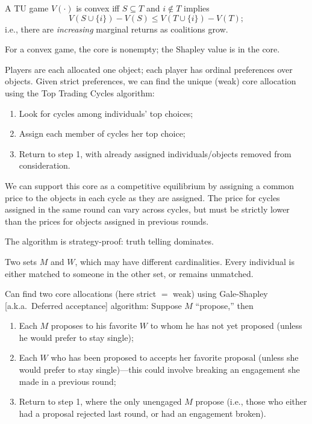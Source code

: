 \documentclass[8pt,letterpaper, landscape]{extarticle} %
\begin{document}
\begin{multicols}{3}
\begin{description}
 A TU game $ V (\cdot) $ is convex iff $ S \subseteq T $ and $ i \not \in T $ implies
\[ V(S \cup \{ i \}) - V(S) \leq V(T \cup \{ i \}) - V(T); \]
i.e., there are \textit{increasing} marginal returns as coalitions grow.

For a convex game, the core is nonempty; the Shapley value is in the core.

 Players are each allocated one object; each player has ordinal preferences over objects. Given strict preferences, we can find the unique (weak) core allocation using the Top Trading Cycles algorithm:
\begin{enumerate}
\item Look for cycles among individuals' top choices;
\item Assign each member of cycles her top choice;
\item Return to step 1, with already assigned individuals/objects removed from consideration.
\end{enumerate}

We can support this core as a competitive equilibrium by assigning a common price to the objects in each cycle as they are assigned. The price for cycles assigned in the same round can vary across cycles, but must be strictly lower than the prices for objects assigned in previous rounds.

The algorithm is strategy-proof: truth telling dominates.

 Two sets $ M $ and $ W $, which may have different cardinalities. Every individual is either matched to someone in the other set, or remains unmatched.

Can find two core allocations (here strict $ = $ weak) using Gale-Shapley [a.k.a.\ Deferred acceptance] algorithm: Suppose $ M $ ``propose,'' then
\begin{enumerate}
\item Each $ M $ proposes to his favorite $ W $ to whom he has not yet proposed (unless he would prefer to stay single);
\item Each $ W $ who has been proposed to accepts her favorite proposal (unless she would prefer to stay single)---this could involve breaking an engagement she made in a previous round;
\item Return to step 1, where the only unengaged $ M $ propose (i.e., those who either had a proposal rejected last round, or had an engagement broken).
\end{enumerate}


\end{description}
\end{multicols}
\end{document}
